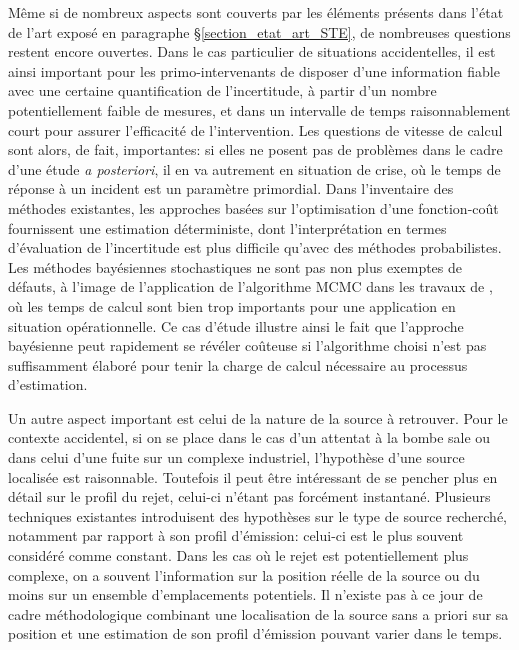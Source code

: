 Même si de nombreux aspects sont couverts par les éléments présents dans l'état de l'art exposé en paragraphe §\ref{section_etat_art_STE}, de nombreuses questions restent encore ouvertes. 
Dans le cas particulier de situations accidentelles, il est ainsi important pour les primo-intervenants de disposer d'une information fiable avec une certaine quantification de l'incertitude, à partir d'un nombre potentiellement faible de mesures, et dans un intervalle de temps raisonnablement court pour assurer l'efficacité de l'intervention. Les questions de vitesse de calcul sont alors, de fait, importantes: si elles ne posent pas de problèmes dans le cadre d'une étude \textit{a posteriori}, il en va autrement en situation de crise, où le temps de réponse à un incident est un paramètre primordial. {Dans l'inventaire des méthodes existantes, les approches basées sur l'optimisation  d'une fonction-coût fournissent une estimation déterministe, dont l'interprétation en termes d'évaluation de l'incertitude est plus difficile qu'avec des méthodes probabilistes. Les méthodes bayésiennes stochastiques ne sont pas non plus exemptes de défauts, à l'image de l'application de l'algorithme MCMC dans les travaux de \cite{Chow2008}, où les temps de calcul sont bien trop importants pour une application en situation opérationnelle. Ce cas d'étude illustre ainsi le fait que l'approche bayésienne peut rapidement se révéler coûteuse si l'algorithme choisi n'est pas suffisamment élaboré pour tenir la charge de calcul nécessaire au processus d'estimation.} 

Un autre aspect important est celui de la nature de la source à retrouver. Pour le contexte accidentel, si on se place dans le cas d'un attentat à la bombe sale ou dans celui d'une fuite sur un complexe industriel, l'hypothèse d'une source localisée est raisonnable. Toutefois il peut être intéressant de se pencher plus en détail sur le profil du rejet, celui-ci n'étant pas forcément instantané. {Plusieurs techniques existantes introduisent des hypothèses sur le type de source recherché, notamment par rapport à son profil d'émission: celui-ci est le plus souvent considéré comme constant. Dans les cas où le rejet est potentiellement plus complexe, on a souvent l'information sur la position réelle de la source ou du moins sur un ensemble d'emplacements potentiels. Il n'existe pas à ce jour de cadre méthodologique combinant une localisation de la source sans a priori sur sa position et une estimation de son profil d'émission pouvant varier dans le temps.}\\

